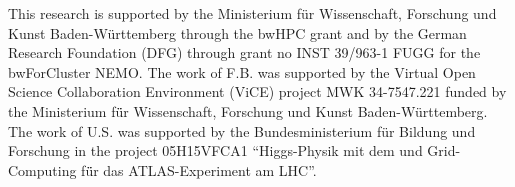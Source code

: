 
%
%


\begin{acknowledgements}
This research is supported by the Ministerium für Wissenschaft, Forschung und
Kunst Baden-W\"urttemberg through the bwHPC grant
and by the German Research Foundation (DFG) through grant no INST
39/963-1 FUGG for the bwForCluster NEMO.
The work of F.B. was supported by the Virtual Open Science
Collaboration Environment (ViCE) project MWK 34-7547.221 funded by the Ministerium f\"ür Wissenschaft, Forschung und
Kunst Baden-W\"urttemberg.
The work of U.S. was supported by  the Bundesministerium f\"ur Bildung und Forschung in the project 05H15VFCA1 
    “Higgs-Physik mit dem und Grid-Computing f\"ür das ATLAS-Experiment am LHC”. 
\end{acknowledgements}

